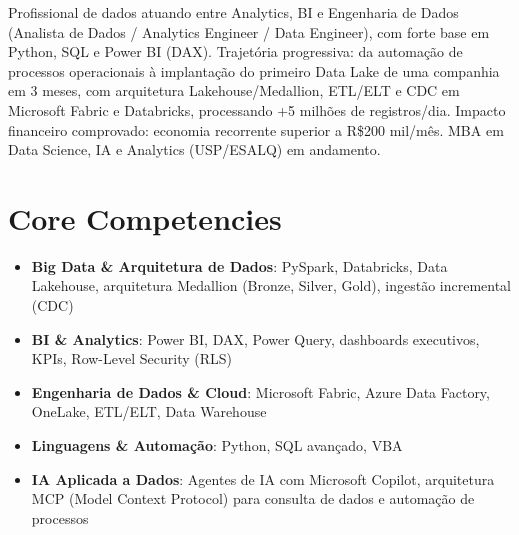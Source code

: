 \documentclass[11pt,a4paper,sans]{moderncv}
\begin{document}
\makecvtitle


\vspace{6pt}
\small{Profissional de dados atuando entre Analytics, BI e Engenharia de Dados (Analista de Dados / Analytics Engineer / Data Engineer), com forte base em Python, SQL e Power BI (DAX). Trajetória progressiva: da automação de processos operacionais à implantação do primeiro Data Lake de uma companhia em 3 meses, com arquitetura Lakehouse/Medallion, ETL/ELT e CDC em Microsoft Fabric e Databricks, processando +5 milhões de registros/dia. Impacto financeiro comprovado: economia recorrente superior a R\$200 mil/mês. MBA em Data Science, IA e Analytics (USP/ESALQ) em andamento.}


\section{Core Competencies}
\vspace{1pt}
\begin{itemize}

\item \textbf{Big Data \& Arquitetura de Dados}: PySpark, Databricks, Data Lakehouse, arquitetura Medallion (Bronze, Silver, Gold), ingestão incremental (CDC)

\item \textbf{BI \& Analytics}: Power BI, DAX, Power Query, dashboards executivos, KPIs, Row-Level Security (RLS)

\item \textbf{Engenharia de Dados \& Cloud}: Microsoft Fabric, Azure Data Factory, OneLake, ETL/ELT, Data Warehouse

\item \textbf{Linguagens \& Automação}: Python, SQL avançado, VBA

\item \textbf{IA Aplicada a Dados}: Agentes de IA com Microsoft Copilot, arquitetura MCP (Model Context Protocol) para consulta de dados e automação de processos

\end{itemize}

\end{document}
